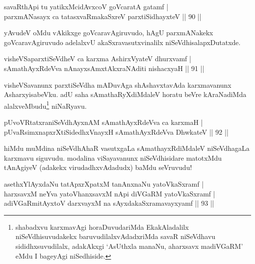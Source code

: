 \begin{shl}
savaRthA\s pi tu yatikxMcidAvxcoV goVcaratA gatamf |\\
parxmANasayx ca tatasxvaRmakaSxreV parxtiSidhayxteV \hfill || 90 ||
\end{shl}

\begin{artha}
yAvudeV oMdu vAkikxge goVcaravAgiruvudo, hAgU parxmANakekx goVcaravAgiruvudo adelalxvU akaSxravasutxvinalilx niSeVdhisalapxDutatxde.
\end{artha}


\begin{shl}
visheVSaparxtiSeVdheV ca karxma AshirxVyateV dhurxvamf |\\
sAmathAyxRdeVva nAnayxsAmxtAkxraNAditi nishacxyaH \hfill || 91 ||
\end{shl}

\begin{artha}
visheVSavanunx parxtiSeVdha mADuvAga shAshavxtavAda karxmavanunx AsharxyisabeVku. adU saha sAmathaRyXdiMdaleV horatu beVre kAraNadiMda alalxveMbudu\footnote[1]{shabadxvu karxmavAgi horaDuvudariMda EkakAladalilx niSeVdhisuvudakekx baruvudilalxvAdadxriMda savaR niSeVdhavu sididhxsuvudilalx, adakAkxgi `AsUthxla manaNu, aharxsavx madiVGaRM' eMdu I bageyAgi niSedhiside.} niNaRyavu.
\end{artha}


\begin{shl}
pUvoVRtatxraniSeVdhAyxnAM sAmathAyxRdeVva ca karxmaH |\\
pUvaRsimxnapxrXtiSidedhxV\s nayxH sAmathAyxRdeVva DhwkateV \hfill || 92 ||
\end{shl}

\begin{artha}
hiMdu muMdina niSeVdhAhaR vasutxgaLa sAmathayxRdiMdaleV niSeVdhagaLa karxmavu siguvudu. modalina viSayavanunx niSeVdhisidare matotxMdu tAnAgiyeV (adakekx virudadhxvAdadudx) baMdu seVruvudu!
\end{artha}%


\begin{shl}
asethxYlAyxdaNu tatApxrXpatxM tanAnxnaNu yatoV\s kaSxramf |\\
harxsavxM neYva yatoV\s hanxsavxM nApi diVGaRM yatoV\s kaSxramf |\\
adiVGaRmitAyxtoV darxvayxM na sAyxdakaSxramavayxyamf \hfill || 93 ||
\end{shl}

